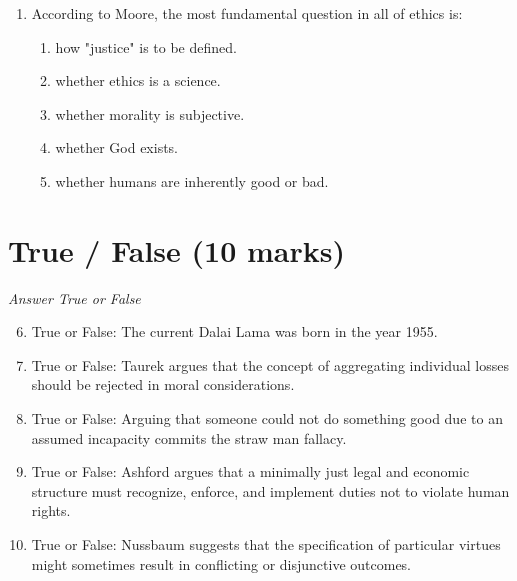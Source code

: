 \documentclass[12pt]{article}
\begin{document}
\begin{enumerate}[label=\arabic*.]
\begin{enumerate}[label=(\alph*)]
    \item The universe is inherently chaotic and unpredictable
    \item God is eternal and merciful to those who offer worship
    \item The world is inherently evil and suffering is inevitable
    \item Life is an illusion and the material world is meaningless
\end{enumerate}
\item According to Moore, the most fundamental question in all of ethics is:
\begin{enumerate}[label=(\alph*)]
    \item how "justice" is to be defined.
    \item whether ethics is a science.
    \item whether morality is subjective.
    \item whether God exists.
    \item whether humans are inherently good or bad.
\end{enumerate}
\end{enumerate}

\section*{True / False (10 marks)}
\textit{Answer True or False}
\begin{enumerate}[label=\arabic*.]
\setcounter{enumi}{5}
\item True or False: The current Dalai Lama was born in the year 1955.
\item True or False: Taurek argues that the concept of aggregating individual losses should be rejected in moral considerations.
\item True or False: Arguing that someone could not do something good due to an assumed incapacity commits the straw man fallacy.
\item True or False: Ashford argues that a minimally just legal and economic structure must recognize, enforce, and implement duties not to violate human rights.
\item True or False: Nussbaum suggests that the specification of particular virtues might sometimes result in conflicting or disjunctive outcomes.
\end{enumerate}
\end{document}

